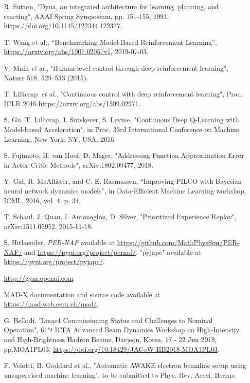\documentclass[
 reprint,
 amsmath,amssymb,amsfonts,clevref,
 aps,
prstab,
]{revtex4-2}
\begin{document}
\begin{thebibliography}{9}
 R. Sutton, "Dyna, an integrated architecture for learning, planning, and reacting", AAAI Spring Symposium, pp. 151-155, 1991, \url{https://doi.org/10.1145/122344.122377}.

 T. Wang et al., “Benchmarking Model-Based Reinforcement Learning”,  \url{https://arxiv.org/abs/1907.02057v1}, 2019-07-03.

 V. Mnih \textit{et al.}, "Human-level control through deep reinforcement learning", Nature 518, 529–533 (2015).

 T. Lillicrap~\textit{et al.}, "Continuous control with deep reinforcement learning", Proc. ICLR 2016 \url{https://arxiv.org/abs/1509.02971}.

 S. Gu, T. Lillicrap, I. Sutskever, S. Levine, "Continuous Deep Q-Learning with Model-based Acceleration", in Proc. 33rd International Conference on Machine Learning, New York, NY, USA, 2016.

 S. Fujimoto, H. van Hoof, D. Meger, "Addressing Function Approximation Error in Actor-Critic Methods", arXiv:1802.09477, 2018.

 Y. Gal, R. McAllister, and C. E. Rasmussen, “Improving PILCO with Bayesian neural network dynamics models”, in Data-Efficient Machine Learning workshop, ICML, 2016, vol. 4, p. 34.

 T. Schaul, J. Quan, I. Antonoglou, D. Silver, "Prioritized Experience Replay", arXiv:1511.05952, 2015-11-18.

 S. Hirlaender, \textit{PER-NAF} available at \url{https://github.com/MathPhysSim/PER-NAF/} and
\url{https://pypi.org/project/pernaf/}.
 "pyjapc" available at \url{https://pypi.org/project/pyjapc/}.

 \url{http://gym.openai.com}

 MAD-X documentation and source code available at \url{https://mad.web.cern.ch/mad/}.

 G. Bellodi, "Linac4 Commissioning Status and Challenges to Nominal Operation", 61$^st$ ICFA Advanced Beam Dynamics Workshop on High-Intensity and High-Brightness Hadron Beams, Daejeon, Korea, 17 - 22 Jun 2018, pp.MOA1PL03, \url{https://doi.org/10.18429/JACoW-HB2018-MOA1PL03}.

 F. Velotti, B. Goddard et al., "Automatic AWAKE electron beamline setup using unsupervised machine learning", to be submitted to Phys. Rev. Accel. Beams.


\end{thebibliography}
\end{document}
